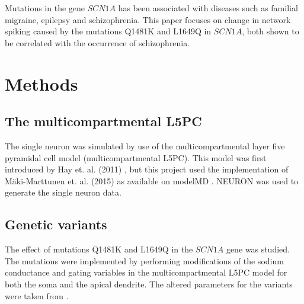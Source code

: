 \documentclass[twocolumn, a4paper,10pt, norsk]{scrartcl}
\begin{document}
Mutations in the gene $SCN1A$ has been associated with diseases such as familial migraine, epilepsy and schizophrenia. This paper focuses on change in network spiking caused by the mutations Q1481K and L1649Q in $SCN1A$, both shown to be correlated with the occurrence of schizophrenia. %







\section*{Methods}
\subsection*{The multicompartmental L5PC}
The single neuron was simulated by use of the multicompartmental layer five pyramidal cell model (multicompartmental L5PC). This model was first introduced by Hay et. al. (2011) \cite{l5pc_model}, but this project used the implementation of M\"aki-Marttunen et. al. (2015)\cite{gautes} as available on modelMD \cite{L5PC_Tuomo_modelMD}. NEURON was used to generate the single neuron data.

\subsection*{Genetic variants}
The effect of mutations Q1481K and L1649Q in the $SCN1A$ gene was studied. The mutations were implemented by performing modifications of the sodium conductance and gating variables in the multicompartmental L5PC model for both the soma and the apical dendrite. %
The altered parameters for the variants were taken from \cite{gautes}. %
\end{document}
